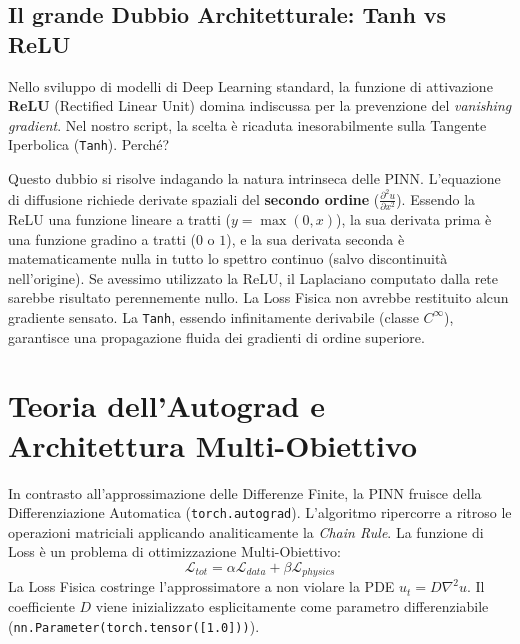 \documentclass[12pt,a4paper]{report}
\begin{document}
\subsection{Il grande Dubbio Architetturale: Tanh vs ReLU}
Nello sviluppo di modelli di Deep Learning standard, la funzione di attivazione \textbf{ReLU} (Rectified Linear Unit) domina indiscussa per la prevenzione del \textit{vanishing gradient}. Nel nostro script, la scelta è ricaduta inesorabilmente sulla Tangente Iperbolica (\texttt{Tanh}). Perché?

Questo dubbio si risolve indagando la natura intrinseca delle PINN. L'equazione di diffusione richiede derivate spaziali del \textbf{secondo ordine} ($\frac{\partial^2 u}{\partial x^2}$). Essendo la ReLU una funzione lineare a tratti ($y = \max(0, x)$), la sua derivata prima è una funzione gradino a tratti ($0$ o $1$), e la sua derivata seconda è matematicamente nulla in tutto lo spettro continuo (salvo discontinuità nell'origine).
Se avessimo utilizzato la ReLU, il Laplaciano computato dalla rete sarebbe risultato perennemente nullo. La Loss Fisica non avrebbe restituito alcun gradiente sensato. La \texttt{Tanh}, essendo infinitamente derivabile (classe $C^\infty$), garantisce una propagazione fluida dei gradienti di ordine superiore.

\section{Teoria dell'Autograd e Architettura Multi-Obiettivo}
In contrasto all'approssimazione delle Differenze Finite, la PINN fruisce della Differenziazione Automatica (\texttt{torch.autograd}). L'algoritmo ripercorre a ritroso le operazioni matriciali applicando analiticamente la \textit{Chain Rule}.
La funzione di Loss è un problema di ottimizzazione Multi-Obiettivo:
\begin{equation}
\mathcal{L}_{tot} = \alpha \mathcal{L}_{data} + \beta \mathcal{L}_{physics}
\end{equation}
La Loss Fisica costringe l'approssimatore a non violare la PDE $u_t = D \nabla^2 u$. Il coefficiente $D$ viene inizializzato esplicitamente come parametro differenziabile (\texttt{nn.Parameter(torch.tensor([1.0]))}).
\end{document}
